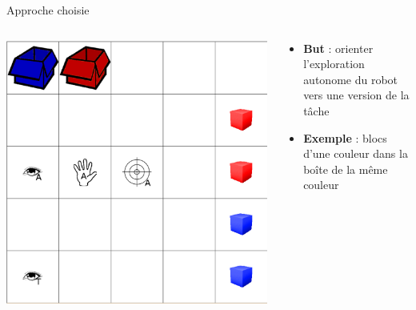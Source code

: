 \documentclass[xcolor=pst,dvips,12pt,english,french]{beamer}
\begin{document}
	\begin{frame}{Approche choisie}
		\begin{columns}
			\begin{column}{0.55\textwidth}
				\includegraphics[width=\textwidth]{images/playroom.eps}
			\end{column}
			\begin{column}{0.45\textwidth}
				\begin{block}{}
					\begin{itemize}
						\item \textbf{But} : orienter l'exploration autonome du robot vers une version de la tâche 
						\item \textbf{Exemple} : blocs d'une couleur dans la boîte de la même couleur
					\end{itemize}
				\end{block}
			\end{column}
		\end{columns}
	\end{frame}
	
\end{document}
